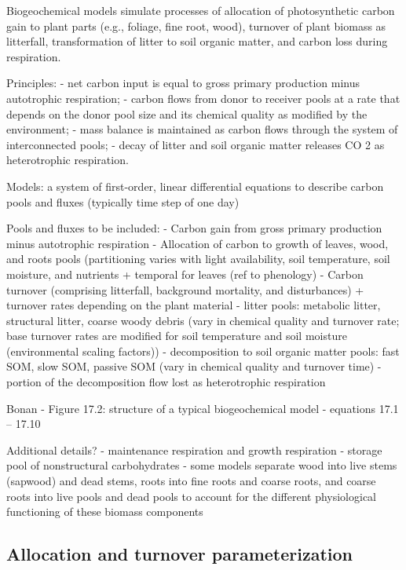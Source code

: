 \documentclass[
  oneside]{book}
\begin{document}
Biogeochemical models simulate processes of allocation of photosynthetic carbon gain to plant parts (e.g., foliage, fine root, wood), turnover of plant biomass as litterfall, transformation of litter to soil organic matter, and carbon loss during respiration.

Principles:
- net carbon input is equal to gross primary production minus autotrophic respiration;
- carbon flows from donor to receiver pools at a rate that depends on the donor pool size and its chemical quality as modified by the environment;
- mass balance is maintained as carbon flows through the system of interconnected pools;
- decay of litter and soil organic matter releases CO 2 as heterotrophic respiration.

Models:
a system of first-order, linear differential equations to describe carbon pools and fluxes (typically time step of one day)

Pools and fluxes to be included:
- Carbon gain from gross primary production minus autotrophic respiration
- Allocation of carbon to growth of leaves, wood, and roots pools (partitioning varies with light availability, soil temperature, soil moisture, and nutrients + temporal for leaves (ref to phenology)
- Carbon turnover (comprising litterfall, background mortality, and disturbances) + turnover rates depending on the plant material
- litter pools: metabolic litter, structural litter, coarse woody debris (vary in chemical quality and turnover rate; base turnover rates are modified for soil temperature and soil moisture (environmental scaling factors))
- decomposition to soil organic matter pools: fast SOM, slow SOM, passive SOM (vary in chemical quality and turnover time)
- portion of the decomposition flow lost as heterotrophic respiration

Bonan
- Figure 17.2: structure of a typical biogeochemical model
- equations 17.1 -- 17.10

Additional details?
- maintenance respiration and growth respiration
- storage pool of nonstructural carbohydrates
- some models separate wood into live stems (sapwood) and dead stems, roots into fine roots and coarse roots, and coarse roots into live pools and dead pools to account for the different physiological functioning of these biomass components

\hypertarget{allocation-and-turnover-parameterization}{%
\subsection{Allocation and turnover parameterization}\label{allocation-and-turnover-parameterization}}
\end{document}
